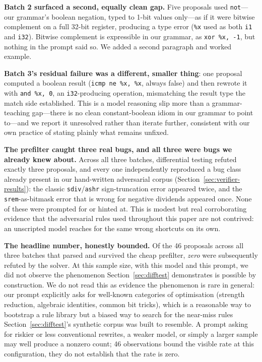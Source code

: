 \documentclass[conference]{IEEEtran}
\begin{document}
\textbf{Batch 2 surfaced a second, equally clean gap.} Five proposals used
\texttt{not}---our grammar's boolean negation, typed to 1-bit values
only---as if it were bitwise complement on a full 32-bit register, producing
a type error (\texttt{\%x} used as both \texttt{i1} and \texttt{i32}). Bitwise
complement is expressible in our grammar, as \texttt{xor \%x, -1}, but nothing
in the prompt said so. We added a second paragraph and worked example.

\textbf{Batch 3's residual failure was a different, smaller thing}: one
proposal computed a boolean result (\texttt{icmp ne \%x, \%x}, always false)
and then rewrote it with \texttt{and \%x, 0}, an \texttt{i32}-producing
operation, mismatching the result type the match side established. This is a
model reasoning slip more than a grammar-teaching gap---there is no clean
constant-boolean idiom in our grammar to point to---and we report it
unresolved rather than iterate further, consistent with our own practice of
stating plainly what remains unfixed.

\textbf{The prefilter caught three real bugs, and all three were bugs we
already knew about.} Across all three batches, differential testing refuted
exactly three proposals, and every one independently reproduced a bug class
already present in our hand-written adversarial corpus
(Section~\ref{sec:verifier-results}): the classic \texttt{sdiv}/\texttt{ashr}
sign-truncation error appeared twice, and the \texttt{srem}-as-bitmask error
that is wrong for negative dividends appeared once. None of these were
prompted for or hinted at. This is modest but real corroborating evidence that
the adversarial rules used throughout this paper are not contrived: an
unscripted model reaches for the same wrong shortcuts on its own.

\textbf{The headline number, honestly bounded.} Of the 46 proposals across all
three batches that parsed and survived the cheap prefilter, \emph{zero} were
subsequently refuted by the solver. At this sample size, with this model and
this prompt, we did not observe the phenomenon Section~\ref{sec:difftest}
demonstrates is possible by construction. We do not read this as evidence the
phenomenon is rare in general: our prompt explicitly asks for well-known
categories of optimisation (strength reduction, algebraic identities, common
bit tricks), which is a reasonable way to bootstrap a rule library but a
biased way to search for the near-miss rules Section~\ref{sec:difftest}'s
synthetic corpus was built to resemble. A prompt asking for riskier or less
conventional rewrites, a weaker model, or simply a larger sample may well
produce a nonzero count; 46 observations bound the visible rate at this
configuration, they do not establish that the rate is zero.
\end{document}

